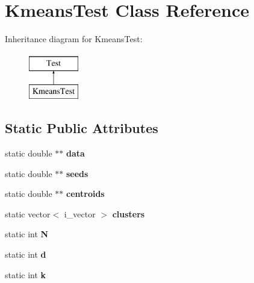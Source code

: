 \hypertarget{classKmeansTest}{\section{Kmeans\+Test Class Reference}
\label{classKmeansTest}
}
Inheritance diagram for Kmeans\+Test\+:\begin{figure}[H]
\begin{center}
\leavevmode
\includegraphics[height=2.000000cm]{classKmeansTest}
\end{center}
\end{figure}
\subsection*{Static Public Attributes}
\begin{DoxyCompactItemize}
\item 
\hypertarget{classKmeansTest_ac49bc85d7f0c6573fdb41291fcad7ea8}{static double $\ast$$\ast$ {\bfseries data}}\label{classKmeansTest_ac49bc85d7f0c6573fdb41291fcad7ea8}

\item 
\hypertarget{classKmeansTest_a02a49c0447e8979c5e42e80798f1909d}{static double $\ast$$\ast$ {\bfseries seeds}}\label{classKmeansTest_a02a49c0447e8979c5e42e80798f1909d}

\item 
\hypertarget{classKmeansTest_ad1d5e54851950f37170c362518fc5aef}{static double $\ast$$\ast$ {\bfseries centroids}}\label{classKmeansTest_ad1d5e54851950f37170c362518fc5aef}

\item 
\hypertarget{classKmeansTest_ab83157ed1cd9481c94b2b5272ca5020d}{static vector$<$ i\+\_\+vector $>$ {\bfseries clusters}}\label{classKmeansTest_ab83157ed1cd9481c94b2b5272ca5020d}

\item 
\hypertarget{classKmeansTest_a881736055281c3d2d5f161a57f37b810}{static int {\bfseries N}}\label{classKmeansTest_a881736055281c3d2d5f161a57f37b810}

\item 
\hypertarget{classKmeansTest_a08d592368c02b1aabe71c26b34796bf6}{static int {\bfseries d}}\label{classKmeansTest_a08d592368c02b1aabe71c26b34796bf6}

\item 
\hypertarget{classKmeansTest_a044e6c5eff9a1a3ddb542771c226bd7b}{static int {\bfseries k}}\label{classKmeansTest_a044e6c5eff9a1a3ddb542771c226bd7b}

\end{DoxyCompactItemize}
